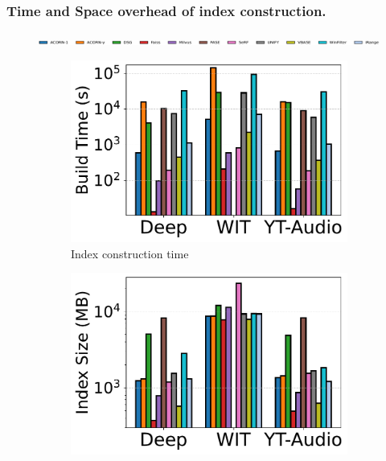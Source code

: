 \documentclass[sigconf, nonacm]{acmart}
\begin{document}
	\subsubsection{Time and Space overhead of index construction.}
	\begin{figure}[t]
		\centering
		\setlength{\abovecaptionskip}{0.3cm}
		\setlength{\belowcaptionskip}{0cm}
		
		\includegraphics[width=0.98\columnwidth]{figures/indexData/rangeFilter_legend_only.pdf}
		
		\vspace{0.3cm}
		
		\begin{subfigure}[t]{0.31\columnwidth}
			\centering
			\includegraphics[width=\linewidth]{figures/indexData/rangeFilter_build_time_comparison_query.pdf}
			\caption{Index construction time}
			\label{fig:rangeFilter_build_time}
		\end{subfigure}
		\hfill
		\begin{subfigure}[t]{0.31\columnwidth}
			\centering
			\includegraphics[width=\linewidth]{figures/indexData/rangeFilter_index_size_mb_comparison_query.pdf}

\end{subfigure}
\end{figure}
\end{document}
